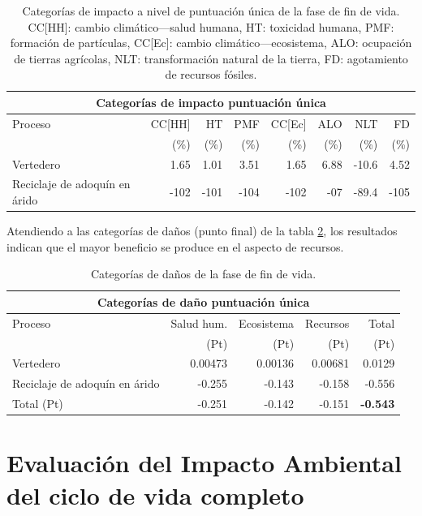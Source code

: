 \begin{table}[!htb]
\centering
\begin{tabular}{p{4cm}rrrrrrr}
\toprule
\multicolumn{8}{c}{Categorías de impacto puntuación única}\\
\midrule
Proceso & CC[HH] & HT & PMF & CC[Ec] & ALO & NLT & FD\\
 &  (\%) & (\%) & (\%) & (\%) & (\%) & (\%) & (\%)\\
\midrule
Vertedero & 1.65 & 1.01 & 3.51 & 1.65 & 6.88 & -10.6 & 4.52\\
Reciclaje de adoquín en árido & -102 & -101 & -104 & -102 & -07 & -89.4 & -105\\
\bottomrule
\end{tabular}
\caption[Categorías de impacto a nivel de puntuación única de la fase de fin de vida.]{Categorías de impacto a nivel de puntuación única de la fase de fin de vida. CC[HH]: cambio climático—salud humana, HT: toxicidad humana, PMF: formación de partículas, CC[Ec]: cambio climático—ecosistema, ALO: ocupación de tierras agrícolas, NLT: transformación natural de la tierra, FD: agotamiento de recursos fósiles.}
\label{categoriasimpactofdvpuntunica}
\end{table}

Atendiendo a las categorías de daños (punto final) de la tabla \ref{categoriasdanosfdv}, los resultados indican que el mayor beneficio se produce en el aspecto de recursos.

\begin{table}[!htb]
\centering
\begin{tabular}{p{6cm}rrrr}
\toprule
\multicolumn{5}{c}{Categorías de daño puntuación única}\\
\midrule
Proceso & Salud hum. & Ecosistema & Recursos & Total\\
 & (Pt) & (Pt) & (Pt) & (Pt)\\
\midrule
Vertedero & 0.00473 & 0.00136 & 0.00681 & 0.0129\\
Reciclaje de adoquín en árido & -0.255 & -0.143 & -0.158 & -0.556\\
\midrule
Total (Pt) & -0.251 & -0.142 & -0.151 & \textbf{-0.543}\\
\bottomrule
\end{tabular}
\caption{Categorías de daños de la fase de fin de vida.}
\label{categoriasdanosfdv}
\end{table}

\section{Evaluación del Impacto Ambiental del ciclo de vida completo}

